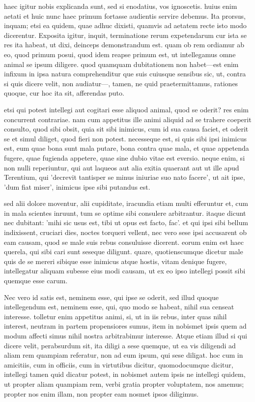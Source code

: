  haec igitur nobis explicanda sunt, sed si enodatius, vos ignoscetis. huius enim aetati et huic nunc haec primum fortasse audientis servire debemus. Ita prorsus, inquam; etsi ea quidem, quae adhuc dixisti, quamvis ad aetatem recte isto modo dicerentur. Exposita igitur, inquit, terminatione rerum expetendarum cur ista se res ita habeat, ut dixi, deinceps demonstrandum est. quam ob rem ordiamur ab eo, quod primum posui, quod idem reapse primum est, ut intellegamus omne animal se ipsum diligere. quod quamquam dubitationem non habet—est enim infixum in ipsa natura comprehenditur que suis cuiusque sensibus sic, ut, contra si quis dicere velit, non audiatur—, tamen, ne quid praetermittamus, rationes quoque, cur hoc ita sit, afferendas puto.

 etsi qui potest intellegi aut cogitari esse aliquod animal, quod se oderit? res enim concurrent contrariae. nam cum appetitus ille animi aliquid ad se trahere coeperit consulto, quod sibi obsit, quia sit sibi inimicus, cum id sua causa faciet, et oderit se et simul diliget, quod fieri non potest. necesseque est, si quis sibi ipsi inimicus est, eum quae bona sunt mala putare, bona contra quae mala, et quae appetenda fugere, quae fugienda appetere, quae sine dubio vitae est eversio. neque enim, si non nulli reperiuntur, qui aut laqueos aut alia exitia quaerant aut ut ille apud Terentium, qui 'decrevit tantisper se minus iniuriae suo nato facere', ut ait ipse, 'dum fiat miser', inimicus ipse sibi putandus est.

 sed alii dolore moventur, alii cupiditate, iracundia etiam multi efferuntur et, cum in mala scientes inruunt, tum se optime sibi consulere arbitrantur. itaque dicunt nec dubitant: 'mihi sic usus est, tibi ut opus est facto, fac'. et qui ipsi sibi bellum indixissent, cruciari dies, noctes torqueri vellent, nec vero sese ipsi accusarent ob eam causam, quod se male suis rebus consuluisse dicerent. eorum enim est haec querela, qui sibi cari sunt seseque diligunt. quare, quotienscumque dicetur male quis de se mereri sibique esse inimicus atque hostis, vitam denique fugere, intellegatur aliquam subesse eius modi causam, ut ex eo ipso intellegi possit sibi quemque esse carum.

 Nec vero id satis est, neminem esse, qui ipse se oderit, sed illud quoque intellegendum est, neminem esse, qui, quo modo se habeat, nihil sua censeat interesse. tolletur enim appetitus animi, si, ut in iis rebus, inter quas nihil interest, neutram in partem propensiores sumus, item in nobismet ipsis quem ad modum affecti simus nihil nostra arbitrabimur interesse. Atque etiam illud si qui dicere velit, perabsurdum sit, ita diligi a sese quemque, ut ea vis diligendi ad aliam rem quampiam referatur, non ad eum ipsum, qui sese diligat. hoc cum in amicitiis, cum in officiis, cum in virtutibus dicitur, quomodocumque dicitur, intellegi tamen quid dicatur potest, in nobismet autem ipsis ne intellegi quidem, ut propter aliam quampiam rem, verbi gratia propter voluptatem, nos amemus; propter nos enim illam, non propter eam nosmet ipsos diligimus.

